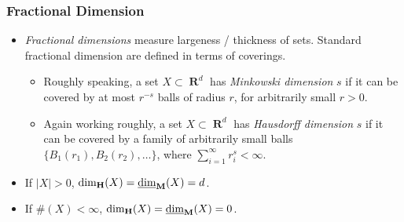 \documentclass[usenames,dvipsnames,handout]{beamer}
\DeclareMathOperator{\RR}{\textbf{R}}
\DeclareMathOperator{\hausdim}{\text{dim}_{\textbf{H}}}
\DeclareMathOperator{\lowminkdim}{\text{\underline{dim}}_{\textbf{M}}}
\begin{document}
\begin{frame}
  \frametitle{Fractional Dimension}

\begin{itemize}
    \item<1-> \emph{Fractional dimensions} measure largeness / thickness of sets. Standard fractional dimension are defined in terms of coverings.
    \begin{itemize}
        \item Roughly speaking, a set $X \subset \RR^d$ has \emph{Minkowski dimension} $s$ if it can be covered by at most $r^{-s}$ balls of radius $r$, for arbitrarily small $r > 0$.

        \item Again working roughly, a set $X \subset \RR^d$ has \emph{Hausdorff dimension} $s$ if it can be covered by a family of arbitrarily small balls $\{ B_1(r_1), B_2(r_2),\dots \}$, where $\sum_{i = 1}^\infty r_i^s < \infty$.
    \end{itemize}
    \item If $|X| > 0$, $\hausdim(X) = \lowminkdim(X) = d$.

    \item If $\#(X) < \infty$, $\hausdim(X) = \lowminkdim(X) = 0$.
\end{itemize}

\end{frame}
\end{document}
